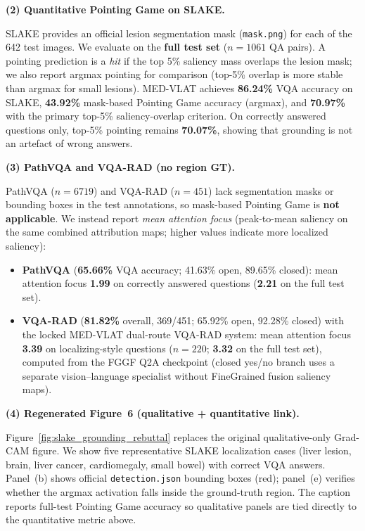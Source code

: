\medskip
\noindent\textbf{(2) Quantitative Pointing Game on SLAKE.}

SLAKE provides an official lesion segmentation mask (\texttt{mask.png}) for each
of the 642 test images. We evaluate on the \textbf{full test set}
($n{=}1061$ QA pairs). A pointing prediction is a \emph{hit} if the top 5\%
saliency mass overlaps the lesion mask; we also report argmax pointing for
comparison (top-5\% overlap is more stable than argmax for small lesions).
MED-VLAT achieves \textbf{86.24\%} VQA accuracy on SLAKE,
\textbf{43.92\%} mask-based Pointing Game accuracy (argmax), and
\textbf{70.97\%} with the primary top-5\% saliency-overlap criterion. On
correctly answered questions only, top-5\% pointing remains \textbf{70.07\%},
showing that grounding is not an artefact of wrong answers.

\medskip
\noindent\textbf{(3) PathVQA and VQA-RAD (no region GT).}

PathVQA ($n{=}6719$) and VQA-RAD ($n{=}451$) lack segmentation masks or
bounding boxes in the test annotations, so mask-based Pointing Game is
\textbf{not applicable}. We instead report \emph{mean attention focus}
(peak-to-mean saliency on the same combined attribution maps; higher values
indicate more localized saliency):
\begin{itemize}
  \item \textbf{PathVQA} (\textbf{65.66\%} VQA accuracy; 41.63\% open,
        89.65\% closed): mean attention focus \textbf{1.99} on correctly
        answered questions (\textbf{2.21} on the full test set).
  \item \textbf{VQA-RAD} (\textbf{81.82\%} overall, 369/451; 65.92\% open,
        92.28\% closed) with the locked MED-VLAT dual-route VQA-RAD system:
        mean attention focus \textbf{3.39} on localizing-style questions
        ($n{=}220$; \textbf{3.32} on the full test set), computed from the
        FGGF Q2A checkpoint (closed yes/no branch uses a separate
        vision--language specialist without FineGrained fusion saliency maps).
\end{itemize}

\medskip
\noindent\textbf{(4) Regenerated Figure~6 (qualitative + quantitative link).}

Figure~\ref{fig:slake_grounding_rebuttal} replaces the original qualitative-only
Grad-CAM figure. We show five representative SLAKE localization cases (liver
lesion, brain, liver cancer, cardiomegaly, small bowel) with correct VQA
answers. Panel~(b) shows official \texttt{detection.json} bounding boxes (red);
panel~(e) verifies whether the argmax activation falls inside the ground-truth
region. The caption reports full-test Pointing Game accuracy so qualitative
panels are tied directly to the quantitative metric above.

